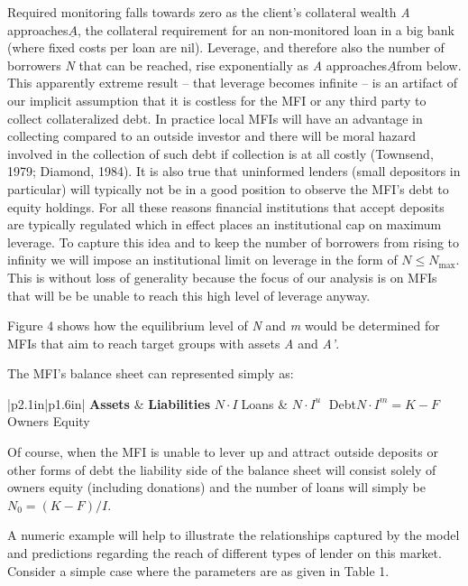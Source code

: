 \documentclass{article} %
\begin{document}
Required monitoring falls towards zero as the client's collateral wealth \textit{A} approaches$\underline{A}$, the collateral requirement for an non-monitored loan in a big bank (where fixed costs per loan are nil).  Leverage, and therefore also the number of borrowers \textit{N} that can be reached, rise exponentially as \textit{A} approaches$\underline{A}$from below. This apparently extreme result -- that leverage becomes infinite -- is an artifact of our implicit assumption that it is costless for the MFI or any third party to collect collateralized debt.  In practice local MFIs will have an advantage in collecting compared to an outside investor and there will be moral hazard involved in the collection of such debt if collection is at all costly (Townsend, 1979; Diamond, 1984).  It is also true that uninformed lenders (small depositors in particular) will typically not be in a good position to observe the MFI's debt to equity holdings. For all these reasons financial institutions that accept deposits are typically regulated which in effect places an institutional cap on maximum leverage.  To capture this idea and to keep the number of borrowers from rising to infinity we will impose an institutional limit on leverage in the form of $N\le N_{\max } .$ This is without loss of generality because the focus of our analysis is on MFIs that will be be unable to reach this high level of leverage anyway. 

Figure 4 shows how the equilibrium level of \textit{N} and \textit{m} would be determined for MFIs that aim to reach target groups with assets \textit{A} and \textit{A'}.   

The MFI's balance sheet can represented simply as:

\begin{tabular}{|p{2.1in}|p{1.6in}|} \hline 
\textbf{Assets} & \textbf{Liabilities}  \hline 
$N\cdot I\; $Loans & $N\cdot I^{u} \; $   Debt\newline $N\cdot I^{m} =K-F$    Owners Equity  \hline 
\end{tabular}



\noindent Of course, when the MFI is unable to lever up and attract outside deposits or other forms of debt the liability side of the balance sheet will consist solely of owners equity (including donations) and the number of loans will simply be $N_{0} =(K-F)/I$.  

A numeric example will help to illustrate the relationships captured by the model and predictions regarding the reach of different types of lender on this market. Consider a simple case where the parameters are as given in Table 1. 
\end{document}
